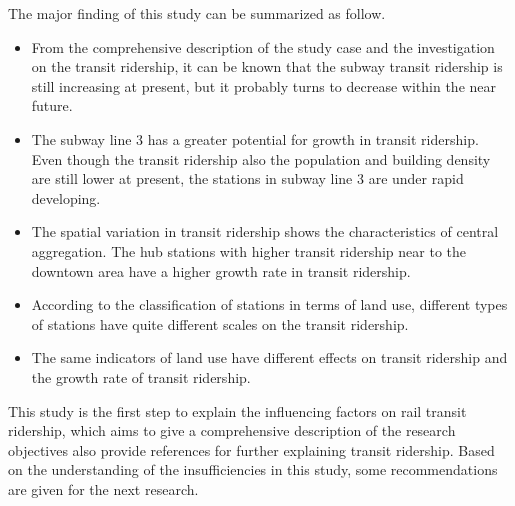%
The major finding of this study can be summarized as follow. 

%
\begin{itemize}
	\item From the comprehensive description of the study case and the investigation on the transit ridership, it can be known that the subway transit ridership is still increasing at present, but it probably turns to decrease within the near future. 
	
	\item The subway line 3 has a greater potential for growth in transit ridership. Even though the transit ridership also the population and building density are still lower at present, the stations in subway line 3 are under rapid developing.
	
	\item The spatial variation in transit ridership shows the characteristics of central aggregation. The hub stations with higher transit ridership near to the downtown area have a higher growth rate in transit ridership.
	
	\item According to the classification of stations in terms of land use, different types of stations have quite different scales on the transit ridership.
	
	\item The same indicators of land use have different effects on transit ridership and the growth rate of transit ridership.
\end{itemize}

%
This study is the first step to explain the influencing factors on rail transit ridership, which aims to give a comprehensive description of the research objectives also provide references for further explaining transit ridership. Based on the understanding of the insufficiencies in this study, some recommendations are given for the next research.

